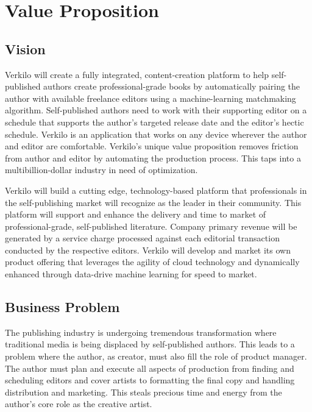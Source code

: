 \documentclass[11pt,openany]{book}
\begin{document}
\hypertarget{value-proposition}{%
\chapter{Value Proposition}\label{value-proposition}}

\hypertarget{vision}{%
\section{Vision}\label{vision}}

Verkilo will create a fully integrated, content-creation platform to
help self-published authors create professional-grade books by
automatically pairing the author with available freelance editors using
a machine-learning matchmaking algorithm. Self-published authors need to
work with their supporting editor on a schedule that supports the
author's targeted release date and the editor's hectic schedule. Verkilo
is an application that works on any device wherever the author and
editor are comfortable. Verkilo's unique value proposition removes
friction from author and editor by automating the production process.
This taps into a multibillion-dollar industry in need of optimization.

Verkilo will build a cutting edge, technology-based platform that
professionals in the self-publishing market will recognize as the leader
in their community. This platform will support and enhance the delivery
and time to market of professional-grade, self-published literature.
Company primary revenue will be generated by a service charge processed
against each editorial transaction conducted by the respective editors.
Verkilo will develop and market its own product offering that leverages
the agility of cloud technology and dynamically enhanced through
data-drive machine learning for speed to market.

\newpage

\hypertarget{business-problem}{%
\section{Business Problem}\label{business-problem}}

The publishing industry is undergoing tremendous transformation where
traditional media is being displaced by self-published authors. This
leads to a problem where the author, as creator, must also fill the role
of product manager. The author must plan and execute all aspects of
production from finding and scheduling editors and cover artists to
formatting the final copy and handling distribution and marketing. This
steals precious time and energy from the author's core role as the
creative artist.
\end{document}
